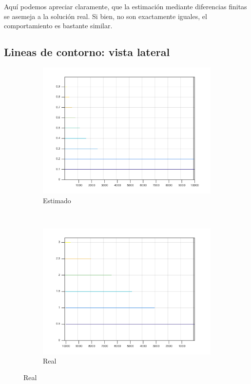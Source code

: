 \documentclass[12pt,letterpaper]{article}
\begin{document}
Aquí podemos apreciar claramente, que la estimación mediante diferencias finitas se asemeja a la solución real. Si bien, no son exactamente iguales, el comportamiento es bastante similar.

\newpage
\subsection{Lineas de contorno: vista lateral}
\begin{figure}[!h]
        \centering
        \begin{subfigure}[h]{0.45\textwidth}
                \includegraphics[width=\textwidth]{estimado_lateral}
                \caption{Estimado}
                \label{fig:gull}
        \end{subfigure}
        ~
        \begin{subfigure}[h]{0.45\textwidth}
                \includegraphics[width=\textwidth]{real_lateral}
                \caption{Real}
                \label{fig:tiger}
        \end{subfigure}
\end{figure}
\end{document}

